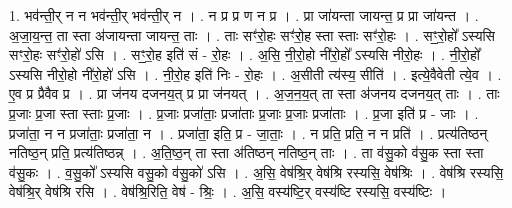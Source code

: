 \documentclass[17pt]{extarticle}
\begin{document}
1. भव॑न्ती॒र् न न भव॑न्ती॒र् भव॑न्ती॒र् न । . न प्र प्र ण न प्र । . प्रा जा॑यन्ता जायन्त॒ प्र प्रा जा॑यन्त । . अ॒जा॒य॒न्त॒ ता स्ता अ॑जायन्ता जायन्त॒ ताः । . ताः सꣳ॑रो॒हः सꣳ॑रो॒ह स्ता स्ताः सꣳ॑रो॒हः । . सꣳ॒॒रो॒हो᳚ ऽस्यसि सꣳरो॒हः सꣳ॑रो॒हो॑ ऽसि । . सꣳ॒॒रो॒ह इति॑ सं - रो॒हः । . अ॒सि॒ नी॒रो॒हो नी॑रो॒हो᳚ ऽस्यसि नीरो॒हः । . नी॒रो॒हो᳚ ऽस्यसि नीरो॒हो नी॑रो॒हो॑ ऽसि । . नी॒रो॒ह इति॑ निः - रो॒हः । . अ॒सीती त्य॑स्य॒ सीति॑ । . इत्ये॒वैवेती त्ये॒व । . ए॒व प्र प्रैवैव प्र । . प्रा ज॑नय दजनय॒त् प्र प्रा ज॑नयत् । . अ॒ज॒न॒य॒त् ता स्ता अ॑जनय दजनय॒त् ताः । . ताः प्र॒जाः प्र॒जा स्ता स्ताः प्र॒जाः । . प्र॒जाः प्रजा॑ताः॒ प्रजा॑ताः प्र॒जाः प्र॒जाः प्रजा॑ताः । . प्र॒जा इति॑ प्र - जाः । . प्रजा॑ता॒ न न प्रजा॑ताः॒ प्रजा॑ता॒ न । . प्रजा॑ता॒ इति॒ प्र - जा॒ताः॒ । . न प्रति॒ प्रति॒ न न प्रति॑ । . प्रत्य॑तिष्ठन् नतिष्ठ॒न् प्रति॒ प्रत्य॑तिष्ठन्न् । . अ॒ति॒ष्ठ॒न् ता स्ता अ॑तिष्ठन् नतिष्ठ॒न् ताः । . ता व॑सु॒को व॑सु॒क स्ता स्ता व॑सु॒कः । . व॒सु॒को᳚ ऽस्यसि वसु॒को व॑सु॒को॑ ऽसि । . अ॒सि॒ वेष॑श्रि॒र् वेष॑श्रि रस्यसि॒ वेष॑श्रिः । . वेष॑श्रि रस्यसि॒ वेष॑श्रि॒र् वेष॑श्रि रसि । . वेष॑श्रि॒रिति॒ वेष॑ - श्रिः॒ । . अ॒सि॒ वस्य॑ष्टि॒र् वस्य॑ष्टि रस्यसि॒ वस्य॑ष्टिः । \newline
\end{document}
